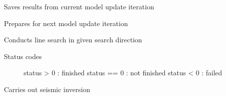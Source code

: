 \documentclass[letterpaper,10pt,english]{sphinxmanual}
\begin{document}
\begin{fulllineitems}
\begin{fulllineitems}
\end{fulllineitems}


\begin{fulllineitems}
\label{\detokenize{ref/seisflows.workflow:seisflows.workflow.inversion.inversion.finalize}}
Saves results from current model update iteration

\end{fulllineitems}


\begin{fulllineitems}
\label{\detokenize{ref/seisflows.workflow:seisflows.workflow.inversion.inversion.initialize}}
Prepares for next model update iteration

\end{fulllineitems}


\begin{fulllineitems}
\label{\detokenize{ref/seisflows.workflow:seisflows.workflow.inversion.inversion.line_search}}
Conducts line search in given search direction
\begin{description}
\item[{Status codes}] \leavevmode
status \textgreater{} 0  : finished
status == 0 : not finished
status \textless{} 0  : failed

\end{description}

\end{fulllineitems}


\begin{fulllineitems}
\label{\detokenize{ref/seisflows.workflow:seisflows.workflow.inversion.inversion.main}}
Carries out seismic inversion


\end{fulllineitems}
\end{fulllineitems}
\end{document}
